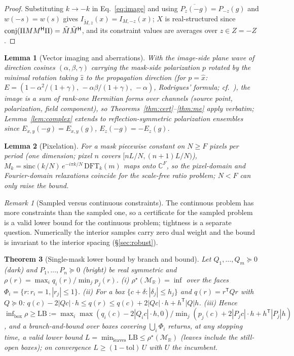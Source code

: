 \documentclass[11pt,a4paper]{article}
\newtheorem{theorem}{Theorem}\newtheorem{lemma}[theorem]{Lemma}\newtheorem{proposition}[theorem]{Proposition}
\theoremstyle{remark}\newtheorem*{remark}{Remark}
\newcommand{\R}{\mathbb{R}}\newcommand{\C}{\mathbb{C}}\newcommand{\PSD}{\succeq 0}
\newcommand{\I}{I}\newcommand{\rhostar}{\rho^{\star}}\newcommand{\NA}{\mathrm{NA}}\newcommand{\EL}{\mathrm{EL}}
\begin{document}
\begin{proof}
Substituting $k\to-k$ in Eq.~\eqref{eq:image} and using $\overline{P_z(-g)}=P_{-z}(g)$ and $w(-s)=w(s)$ gives $\I_{\tilde M,z}(x)=\I_{M,-z}(x)$; $X$ is real-structured since $\operatorname{conj}(\Pi MM^{\mathsf H}\Pi)=\tilde M\tilde M^{\mathsf H}$, and its constraint values are averages over $z\in Z=-Z$.
\end{proof}
\begin{lemma}[Vector imaging and aberrations]\label{lem:vector}
With the image-side plane wave of direction cosines $(\alpha,\beta,\gamma)$ carrying the mask-side polarization $p$ rotated by the minimal rotation taking $\hat z$ to the propagation direction (for $p=\hat x$: $E=(1-\alpha^2/(1+\gamma),\,-\alpha\beta/(1+\gamma),\,-\alpha)$, Rodrigues' formula; cf.\ \cite{flagello1996}), the image is a sum of rank-one Hermitian forms over channels (source point, polarization, field component), so Theorems~\ref{thm:cert}--\ref{thm:me} apply verbatim; Lemma~\ref{lem:complex} extends to reflection-symmetric polarization ensembles since $E_{x,y}(-g)=E_{x,y}(g)$, $E_z(-g)=-E_z(g)$.
\end{lemma}
\begin{lemma}[Pixelation]\label{lem:pixel}
For a mask piecewise constant on $N\ge F$ pixels per period (one dimension; pixel $n$ covers $[nL/N,(n+1)L/N)$), $M_k=\mathrm{sinc}(k/N)\,e^{-i\pi k/N}\,\mathrm{DFT}_k(m)$ maps onto $\C^F$, so the pixel-domain and Fourier-domain relaxations coincide for the scale-free ratio problem; $N<F$ can only raise the bound.
\end{lemma}
\begin{remark}[Sampled versus continuous constraints]
The continuous problem has more constraints than the sampled one, so a certificate for the sampled problem is a valid lower bound for the continuous problem; tightness is a separate question. Numerically the interior samples carry zero dual weight and the bound is invariant to the interior spacing (\S\ref{sec:robust}).
\end{remark}
\begin{theorem}[Single-mask lower bound by branch and bound]\label{thm:bnb}
Let $Q_1,\dots,Q_m\PSD$ (dark) and $P_1,\dots,P_n\PSD$ (bright) be real symmetric and $\rho(r)=\max_iq_i(r)/\min_jp_j(r)$. (i) $\rhostar(\mathcal M_\R)=\inf$ over the faces $\Phi_i=\{r:r_i=1,|r_j|\le1\}$. (ii) For a box $\{c+\delta:|\delta_j|\le h_j\}$ and $q(r)=r^{\mathsf T}Qr$ with $Q\PSD$: $q(c)-2|Qc|\cdot h\le q(r)\le q(c)+2|Qc|\cdot h+h^{\mathsf T}|Q|h$. (iii) Hence $\inf_{\text{box}}\rho\ge\mathrm{LB}:=\max_i\max(q_i(c)-2|Q_ic|\cdot h,0)/\min_j(p_j(c)+2|P_jc|\cdot h+h^{\mathsf T}|P_j|h)$, and a branch-and-bound over boxes covering $\bigcup_i\Phi_i$ returns, at any stopping time, a valid lower bound $L=\min_{\text{leaves}}\mathrm{LB}\le\rhostar(\mathcal M_\R)$ (leaves include the still-open boxes); on convergence $L\ge(1-\mathrm{tol})\,U$ with $U$ the incumbent.
\end{theorem}
\end{document}
